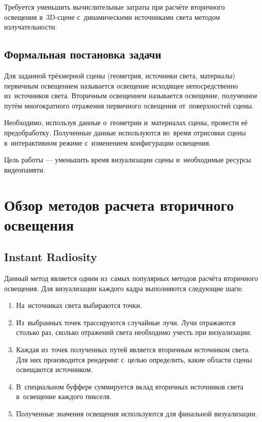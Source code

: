 \documentclass[12pt,fleqn]{article}
\begin{document}
Требуется уменьшить вычислительные затраты при расчёте вторичного освещения в~3D-сцене с~динамическими источниками света методом излучательности.

\subsection{Формальная постановка задачи}

Для заданной трёхмерной сцены (геометрия, источники света, материалы) первичным освещением называется освещение исходящее непосредственно из~источников света. Вторичным освещением называется освещение, полученное путём многократного отражения первичного освещения от~поверхностей сцены.

Необходимо, используя данные о~геометрии и~материалах сцены, провести её предобработку. Полученные данные используются во~время отрисовки сцены в~интерактивном режиме с~изменением конфигурации освещения.

Цель работы --- уменьшить время визуализации сцены и~необходимые ресурсы видеопамяти.

\pagebreak

\section{Обзор методов расчета вторичного освещения}

\subsection{Instant Radiosity}

Данный метод является одним из~самых популярных методов расчёта вторичного освещения. Для визуализации каждого кадра выполняются следующие шаги:

\begin{enumerate}

\item На~источниках света выбираются точки.

\item Из~выбранных точек трассируются случайные лучи. Лучи отражаются столько раз, сколько отражений света необходимо учесть при визуализации.

\item Каждая из~точек полученных путей является вторичным источником света. Для них производится рендеринг с~целью определить, какие области сцены освещаются источником.

\item В~специальном буффере суммируется вклад вторичных источников света в~освещение каждого пикселя.

\item Полученные значения освещения используются для финальной визуализации.

\end{enumerate}
\end{document}
